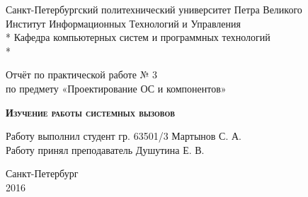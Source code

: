 \begin{titlepage}
\thispagestyle{empty}

\begin{center}
Санкт-Петербургский политехнический университет Петра Великого\\
Институт Информационных Технологий и Управления \\*
Кафедра компьютерных систем и программных технологий \\*
\hrulefill
\end{center}

\vspace{15em}

\begin{center}
\Large Отчёт по практической работе № 3\\по предмету «Проектирование ОС и компонентов» \\
\end{center}

\vspace{1em}

\begin{center}
\textsc{\textbf{Изучение работы системных вызовов}}
\end{center}

\vspace{20em}

\begin{flushleft}
Работу выполнил студент гр. 63501/3 \hrulefill Мартынов С. А. \\
\vspace{1.5em}
Работу принял преподаватель \hrulefill Душутина Е. В. \\
\end{flushleft}

\vspace{\fill}

\begin{center}
Санкт-Петербург \\
2016
\end{center}

\end{titlepage}
\setcounter{page}{2}